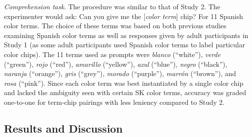 \documentclass[
  english,
  ,man,floatsintext]{apa6}
\begin{document}
\emph{Comprehension task}. The procedure was similar to that of Study 2. The experimenter would ask: Can you give me the {[}\emph{color term}{]} chip? For 11 Spanish color terms. The choice of these terms was based on both previous studies examining Spanish color terms as well as responses given by adult participants in Study 1 (as some adult participants used Spanish color terms to label particular color chips). The 11 terms used as prompts were \emph{blanco} (\enquote{white}), \emph{verde} (\enquote{green}), \emph{rojo} (\enquote{red}), \emph{amarillo} (\enquote{yellow}), \emph{azul} (\enquote{blue}), \emph{negro} (\enquote{black}), \emph{naranja} (\enquote{orange}), \emph{gris} (\enquote{grey}), \emph{morado} (\enquote{purple}), \emph{marrón} (\enquote{brown}), and \emph{rosa} (\enquote{pink}). Since each color term was best instantiated by a single color chip and lacked the ambiguity seen with certain SK color terms, accuracy was graded one-to-one for term-chip pairings with less leniency compared to Study 2.

\hypertarget{results-and-discussion-2}{%
\subsection{Results and Discussion}\label{results-and-discussion-2}}
\end{document}
